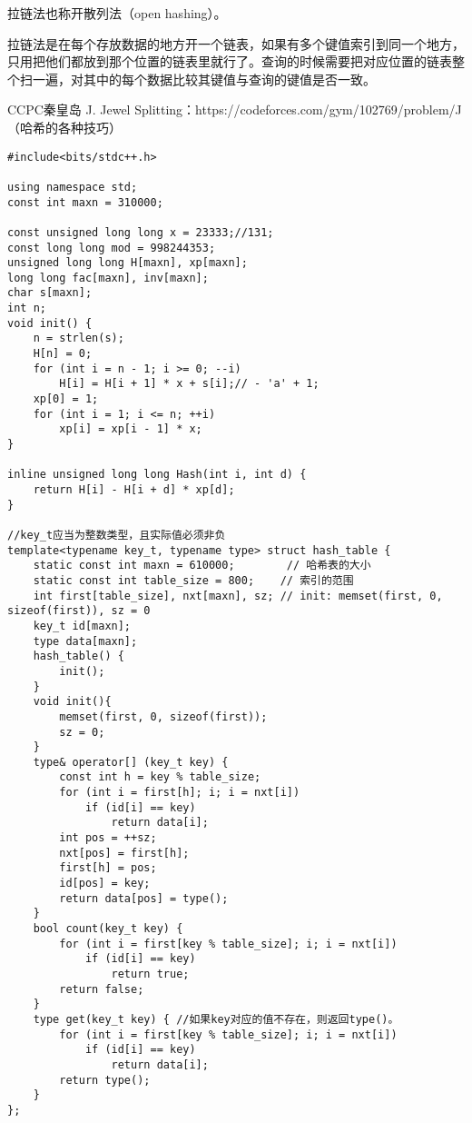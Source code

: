 \par \noindent 拉链法也称开散列法（open hashing）。
~\\
\par \noindent 拉链法是在每个存放数据的地方开一个链表，如果有多个键值索引到同一个地方，只用把他们都放到那个位置的链表里就行了。查询的时候需要把对应位置的链表整个扫一遍，对其中的每个数据比较其键值与查询的键值是否一致。
\begin{tcolorbox}
\par {} CCPC秦皇岛 J. Jewel Splitting：https://codeforces.com/gym/102769/problem/J（哈希的各种技巧）
\end{tcolorbox}
\begin{verbatim}
#include<bits/stdc++.h>

using namespace std;
const int maxn = 310000;

const unsigned long long x = 23333;//131;
const long long mod = 998244353;
unsigned long long H[maxn], xp[maxn];
long long fac[maxn], inv[maxn];
char s[maxn];
int n;
void init() {
    n = strlen(s);
    H[n] = 0;
    for (int i = n - 1; i >= 0; --i)
        H[i] = H[i + 1] * x + s[i];// - 'a' + 1;
    xp[0] = 1;
    for (int i = 1; i <= n; ++i)
        xp[i] = xp[i - 1] * x;
}

inline unsigned long long Hash(int i, int d) {
    return H[i] - H[i + d] * xp[d];
}

//key_t应当为整数类型，且实际值必须非负
template<typename key_t, typename type> struct hash_table {
    static const int maxn = 610000;        // 哈希表的大小
    static const int table_size = 800;    // 索引的范围
    int first[table_size], nxt[maxn], sz; // init: memset(first, 0, sizeof(first)), sz = 0
    key_t id[maxn];
    type data[maxn];
    hash_table() {
        init();
    }
    void init(){
        memset(first, 0, sizeof(first));
        sz = 0;
    }
    type& operator[] (key_t key) {
        const int h = key % table_size;
        for (int i = first[h]; i; i = nxt[i])
            if (id[i] == key)
                return data[i];
        int pos = ++sz;
        nxt[pos] = first[h];
        first[h] = pos;
        id[pos] = key;
        return data[pos] = type();
    }
    bool count(key_t key) {
        for (int i = first[key % table_size]; i; i = nxt[i])
            if (id[i] == key)
                return true;
        return false;
    }
    type get(key_t key) { //如果key对应的值不存在，则返回type()。
        for (int i = first[key % table_size]; i; i = nxt[i])
            if (id[i] == key)
                return data[i];
        return type();
    }
};


\end{verbatim}
